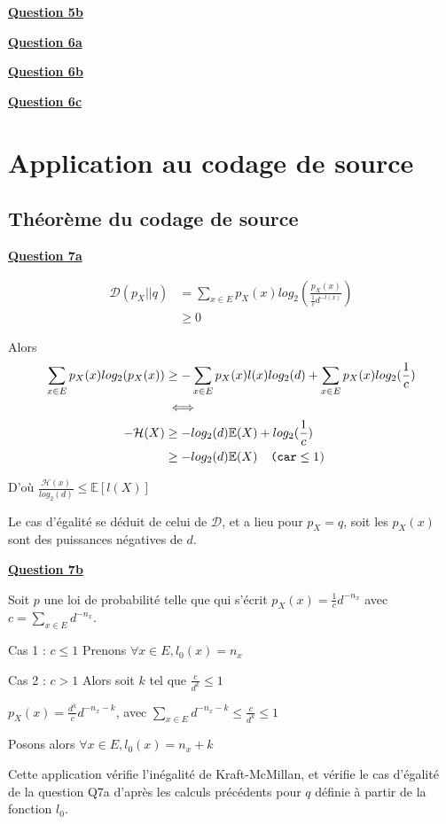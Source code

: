 \documentclass[a4paper,twoside,10pt]{article}
\renewcommand{\H}{\mathcal{H}}
\newcommand{\D}{\mathcal{D}}
\newenvironment{Q}[1]{%
\vspace{1ex}
\underline{\textbf{Question #1\\}}
\newline
}{
\vspace{2ex}
}
\begin{document}
\begin{Q}{5b}

\end{Q}

\begin{Q}{6a}

\end{Q}

\begin{Q}{6b}
\end{Q}

\begin{Q}{6c}
\end{Q}

\section{Application au codage de source}
\subsection{Théorème du codage de source}

\begin{Q}{7a}

\begin{align*}
\D(p_X||q) &= \sum_{x \in E}p_X(x)log_2(\frac{p_X(x)}{\frac{1}{c}d^{-l(x)}}) \\
&\geq 0
\end{align*}

Alors
\begin{align*}
\sum_{x \in E}p_X(x)log_2(p_X(x)) &\geq  -\sum_{x \in E}p_X(x)l(x)log_2(d) + \sum_{x \in E}p_X(x)log_2(\frac{1}{c}) \\
 &\iff\\
-\H(X) &\geq -log_2(d) \mathbb{E}(X) + log_2(\frac{1}{c})
\\ &\geq -log_2(d) \mathbb{E}(X) \texttt{\quad(car} \leq 1 \textsc{)}
\end{align*}

D'où $\frac{\H(x)}{log_2(d)} \leq \mathbb{E}[l(X)]$
 
Le cas d'égalité se déduit de celui de $\D$, et a lieu pour $p_X = q$, soit les $p_X(x)$ sont des puissances négatives de $d$.
\end{Q}

\begin{Q}{7b}
Soit $p$ une loi de probabilité telle que qui s'écrit $p_X(x) = \frac{1}{c}d^{-n_x}$ avec $c = \sum_{x \in E} d^{-n_x}$.

Cas 1 : $c \leq 1$ Prenons $\forall x \in E, l_0(x) = n_x$

Cas 2 : $c > 1$ Alors soit $k$ tel que $\frac{c}{d^k} \leq 1$

$p_X(x) = \frac{d^k}{c}d^{-n_x - k}$, avec $\sum_{x \in E} d^{-n_x - k} \leq \frac{c}{d^k} \leq 1$

Posons alors $\forall x \in E, l_0(x) = n_x + k$

Cette application vérifie l'inégalité de Kraft-McMillan, et vérifie le cas d'égalité de la question Q7a d'après les calculs
précédents pour $q$ définie à partir de la fonction $l_0$.
\end{Q}
\end{document}
